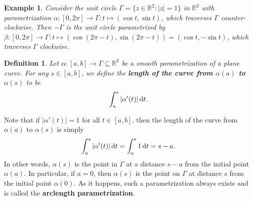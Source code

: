 \documentclass[10pt]{article}
\newcommand{\R}{\mathbb{R}}
\theoremstyle{newstyle}
\newtheorem{defn}[thm]{Definition}
\newtheorem{exmp}[thm]{Example}
\begin{document}
\begin{center}

\end{center}

\begin{exmp}
Consider the unit circle $\Gamma = \{z \in \R^2 : |z| = 1\}$ in $\R^2$ with parametrization 
$\alpha : [0, 2\pi] \to \Gamma : t \mapsto (\cos t, \sin t)$, which traverses $\Gamma$
counter-clockwise. Then $-\Gamma$ is the unit circle parametrized by 
$\beta : [0, 2\pi] \to \Gamma : t \mapsto (\cos(2\pi-t), \sin(2\pi-t)) = (\cos t, -\sin t)$, 
which traverses $\Gamma$ clockwise.
\end{exmp}

\begin{defn}
Let $\alpha : [a, b] \to \Gamma \subseteq \R^2$ be a smooth parametrization of a plane curve. 
For any $s \in [a, b]$, we define the {\bf length of the curve from $\alpha(a)$ to 
$\alpha(s)$} to be 
\[ \int_a^s |\alpha'(t)|\,{\rm d}t. \]
\end{defn}

Note that if $|\alpha'(t)| = 1$ for all $t \in [a, b]$, then the length of the curve from 
$\alpha(a)$ to $\alpha(s)$ is simply 
\[ \int_a^s |\alpha'(t)|\,{\rm d}t = \int_a^s 1\,{\rm d}t = s - a. \]
In other words, $\alpha(s)$ is the point in $\Gamma$ at a distance $s-a$ from the initial point 
$\alpha(a)$. In particular, if $a = 0$, then $\alpha(s)$ is the point on $\Gamma$ 
at distance $s$ from the initial point $\alpha(0)$. As it happens, such a parametrization always 
exists and is called the {\bf arclength parametrization}.
\end{document}
